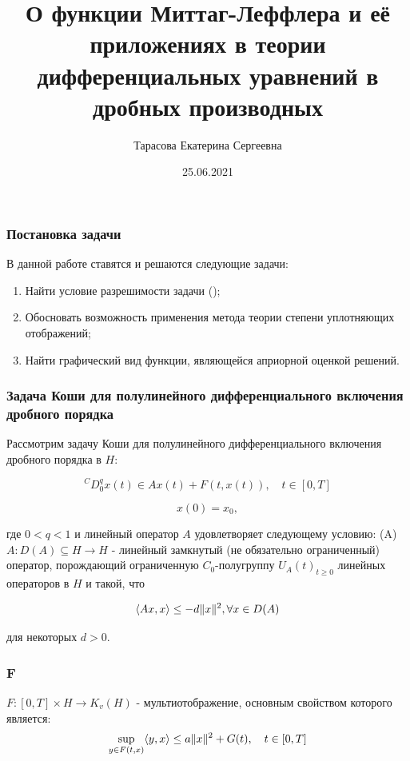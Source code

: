 \documentclass{beamer}
\title{О функции Миттаг-Леффлера и её приложениях в теории дифференциальных уравнений в дробных производных}
\date{25.06.2021}
\author{Тарасова Екатерина Сергеевна}
\DeclarePairedDelimiter{\norm}{\lVert}{\rVert}
\begin{document}
    \frame{\titlepage}

    \begin{frame}
        \frametitle{Постановка задачи}
        В данной работе ставятся и решаются следующие задачи:
        \begin{enumerate}
            \item Найти условие разрешимости задачи ();
            \item Обосновать возможность применения метода теории степени уплотняющих отображений;
            \item Найти графический вид функции, являющейся априорной оценкой решений.
        \end{enumerate}
    \end{frame}

    \begin{frame}
        \frametitle{Задача Коши для полулинейного дифференциального включения дробного порядка}
        Рассмотрим задачу Коши для полулинейного дифференциального включения дробного порядка в $H$:

        \begin{equation}
            \label{eq:cd_0q}
            {}^CD_{0}^{q}x(t) \in Ax(t) + F(t, x(t)), \quad t \in [0, T]
        \end{equation}

        \begin{equation}
            \label{eq:cd_0q_x0}
            x(0) = x_0,
        \end{equation}

        \noindent где $0 < q < 1$ и линейный оператор $A$ удовлетворяет следующему условию:
        (A) $A: D(A) \subseteq H \rightarrow H$ - линейный замкнутый (не обязательно ограниченный) оператор, порождающий ограниченную $C_0$-полугруппу
        ${U_A(t)}_{t \geq 0}$ линейных операторов в $H$ и такой, что

        \begin{equation*}
            \langle Ax, x \rangle \leq -d \norm{x}^2, \forall x \in D(A)
        \end{equation*}

        \noindent для некоторых $d > 0$.
    \end{frame}

    \begin{frame}
        \frametitle{F}
        $F: [0, T] \times H \rightarrow K_v(H)$ - мультиотображение, основным свойством которого является:
        \begin{equation*}
            \sup_{y \in F(t,x)} \langle y,x \rangle \leq a \norm{x}^2 + G(t), \quad t \in [0, T]
        \end{equation*}
    \end{frame}
\end{document}

